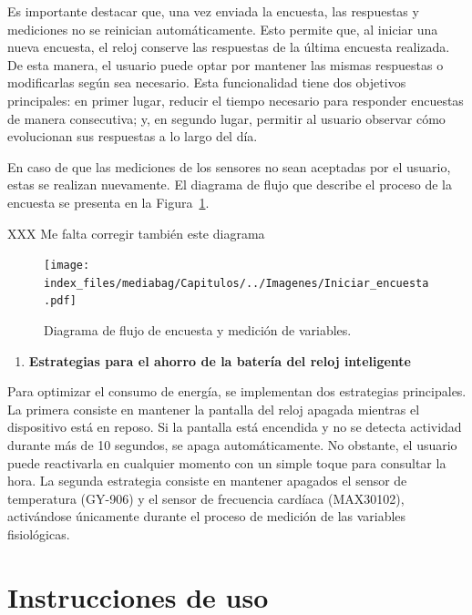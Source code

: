 \documentclass[
  12pt,
  letterpaper,
  DIV=11,
  numbers=noendperiod]{scrreport}
\providecommand{\tightlist}{%
  \setlength{\itemsep}{0pt}\setlength{\parskip}{0pt}}\usepackage{longtable,booktabs,array}
\begin{document}
Es importante destacar que, una vez enviada la encuesta, las respuestas
y mediciones no se reinician automáticamente. Esto permite que, al
iniciar una nueva encuesta, el reloj conserve las respuestas de la
última encuesta realizada. De esta manera, el usuario puede optar por
mantener las mismas respuestas o modificarlas según sea necesario. Esta
funcionalidad tiene dos objetivos principales: en primer lugar, reducir
el tiempo necesario para responder encuestas de manera consecutiva; y,
en segundo lugar, permitir al usuario observar cómo evolucionan sus
respuestas a lo largo del día.

En caso de que las mediciones de los sensores no sean aceptadas por el
usuario, estas se realizan nuevamente. El diagrama de flujo que describe
el proceso de la encuesta se presenta en la
Figura~\ref{fig-iniciarencuesta}.

XXX Me falta corregir también este diagrama

\begin{figure}

{\centering \texttt{[image: index\_files/mediabag/Capitulos/../Imagenes/Iniciar\_encuesta.pdf]}

}

\caption{\label{fig-iniciarencuesta}Diagrama de flujo de encuesta y
medición de variables.}

\end{figure}

\begin{enumerate}
\def\labelenumi{\arabic{enumi}.}
\setcounter{enumi}{3}
\tightlist
\item
  \textbf{Estrategias para el ahorro de la batería del reloj
  inteligente}
\end{enumerate}

Para optimizar el consumo de energía, se implementan dos estrategias
principales. La primera consiste en mantener la pantalla del reloj
apagada mientras el dispositivo está en reposo. Si la pantalla está
encendida y no se detecta actividad durante más de 10 segundos, se apaga
automáticamente. No obstante, el usuario puede reactivarla en cualquier
momento con un simple toque para consultar la hora. La segunda
estrategia consiste en mantener apagados el sensor de temperatura
(GY-906) y el sensor de frecuencia cardíaca (MAX30102), activándose
únicamente durante el proceso de medición de las variables fisiológicas.

\hypertarget{sec-instrucciones}{%
\section{Instrucciones de uso}\label{sec-instrucciones}}
\end{document}
